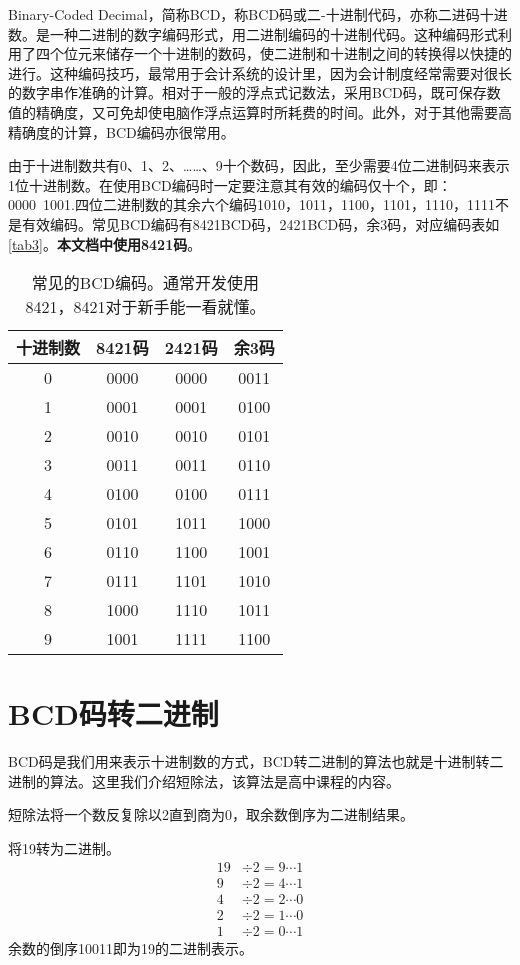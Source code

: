 Binary-Coded Decimal，简称BCD，称BCD码或二-十进制代码，亦称二进码十进数。是一种二进制的数字编码形式，用二进制编码的十进制代码。这种编码形式利用了四个位元来储存一个十进制的数码，使二进制和十进制之间的转换得以快捷的进行。这种编码技巧，最常用于会计系统的设计里，因为会计制度经常需要对很长的数字串作准确的计算。相对于一般的浮点式记数法，采用BCD码，既可保存数值的精确度，又可免却使电脑作浮点运算时所耗费的时间。此外，对于其他需要高精确度的计算，BCD编码亦很常用。

由于十进制数共有0、1、2、……、9十个数码，因此，至少需要4位二进制码来表示1位十进制数。在使用BCD编码时一定要注意其有效的编码仅十个，即：0000~1001.四位二进制数的其余六个编码1010，1011，1100，1101，1110，1111不是有效编码。常见BCD编码有8421BCD码，2421BCD码，余3码，对应编码表如\autoref{tab3}。\textbf{本文档中使用8421码}。
\begin{table}[!ht]
\centering
\begin{tabular}{|c|c|c|c|}
\hline
十进制数&8421码&2421码&余3码\\\hline
0&0000&0000&0011\\\hline
1&0001&0001&0100\\\hline
2&0010&0010&0101\\\hline
3&0011&0011&0110\\\hline
4&0100&0100&0111\\\hline
5&0101&1011&1000\\\hline
6&0110&1100&1001\\\hline
7&0111&1101&1010\\\hline
8&1000&1110&1011\\\hline
9&1001&1111&1100\\\hline
\end{tabular}
\caption{常见的BCD编码。通常开发使用8421，8421对于新手能一看就懂。}\label{tab3}
\end{table}

\section{BCD码转二进制}\label{sec30}
BCD码是我们用来表示十进制数的方式，BCD转二进制的算法也就是十进制转二进制的算法。这里我们介绍短除法，该算法是高中课程的内容。

短除法将一个数反复除以2直到商为0，取余数倒序为二进制结果。
\begin{example}{}{}
将19转为二进制。
\begin{align*}
19&\div2=9\cdots1\\
9&\div2=4\cdots1\\
4&\div2=2\cdots0\\
2&\div2=1\cdots0\\
1&\div2=0\cdots1
\end{align*}
余数的倒序10011即为19的二进制表示。
\end{example}

